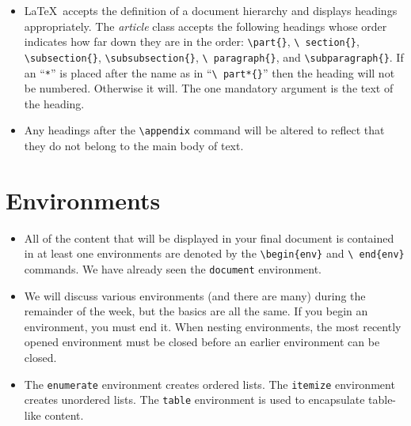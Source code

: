 \begin{itemize}
\item \LaTeX~accepts the definition of a document hierarchy and displays
  headings appropriately. The \textit{article} class accepts the
  following headings whose order indicates how far down they are in the
  order: \texttt{\textbackslash part\{\}}, \texttt{\textbackslash
    section\{\}}, \texttt{\textbackslash subsection\{\}},
  \texttt{\textbackslash subsubsection\{\}}, \texttt{\textbackslash
    paragraph\{\}}, and \texttt{\textbackslash subparagraph\{\}}. If an
  ``\texttt{*}'' is placed after the name as in ``\texttt{\textbackslash
    part*\{\}}'' then the heading will not be numbered. Otherwise it
  will. The one mandatory argument is the text of the heading.

\item Any headings after the \texttt{\textbackslash appendix} command will
  be altered to reflect that they do not belong to the main body of
  text. 
  
\end{itemize}

\section{Environments}

\begin{itemize}
\item All of the content that will be displayed in your final document is
  contained in at least one environments are denoted by the
  \texttt{\textbackslash begin\{env\}} and \texttt{\textbackslash
    end\{env\}} commands. We have already seen the \texttt{document}
  environment.
  
\item We will discuss various environments (and there are many) during the
  remainder of the week, but the basics are all the same. If you begin
  an environment, you must end it. When nesting environments, the most
  recently opened environment must be closed before an earlier
  environment can be closed.
  
\item The \texttt{enumerate} environment creates ordered lists. The
  \texttt{itemize} environment creates unordered lists. The
  \texttt{table} environment is used to encapsulate table-like content.

\end{itemize}

